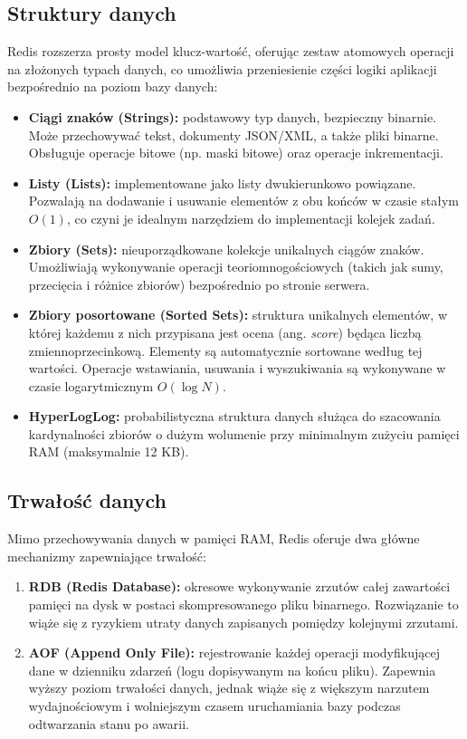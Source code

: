 \subsection{Struktury danych}
Redis rozszerza prosty model klucz-wartość, oferując zestaw atomowych operacji na złożonych typach danych, co umożliwia przeniesienie części logiki aplikacji bezpośrednio na poziom bazy danych:
\begin{itemize}
    \item \textbf{Ciągi znaków (Strings):} podstawowy typ danych, bezpieczny binarnie. Może przechowywać tekst, dokumenty JSON/XML, a także pliki binarne. Obsługuje operacje bitowe (np. maski bitowe) oraz operacje inkrementacji.
    \item \textbf{Listy (Lists):} implementowane jako listy dwukierunkowo powiązane. Pozwalają na dodawanie i usuwanie elementów z obu końców w czasie stałym $O(1)$, co czyni je idealnym narzędziem do implementacji kolejek zadań.
    \item \textbf{Zbiory (Sets):} nieuporządkowane kolekcje unikalnych ciągów znaków. Umożliwiają wykonywanie operacji teoriomnogościowych (takich jak sumy, przecięcia i różnice zbiorów) bezpośrednio po stronie serwera.
    \item \textbf{Zbiory posortowane (Sorted Sets):} struktura unikalnych elementów, w której każdemu z nich przypisana jest ocena (ang. \emph{score}) będąca liczbą zmiennoprzecinkową. Elementy są automatycznie sortowane według tej wartości. Operacje wstawiania, usuwania i wyszukiwania są wykonywane w czasie logarytmicznym $O(\log N)$.
    \item \textbf{HyperLogLog:} probabilistyczna struktura danych służąca do szacowania kardynalności zbiorów o dużym wolumenie przy minimalnym zużyciu pamięci RAM (maksymalnie 12 KB).
\end{itemize}
\subsection{Trwałość danych}
Mimo przechowywania danych w pamięci RAM, Redis oferuje dwa główne mechanizmy zapewniające trwałość:
\begin{enumerate}
    \item \textbf{RDB (Redis Database):} okresowe wykonywanie zrzutów całej zawartości pamięci na dysk w postaci skompresowanego pliku binarnego. Rozwiązanie to wiąże się z ryzykiem utraty danych zapisanych pomiędzy kolejnymi zrzutami.
    \item \textbf{AOF (Append Only File):} rejestrowanie każdej operacji modyfikującej dane w dzienniku zdarzeń (logu dopisywanym na końcu pliku). Zapewnia wyższy poziom trwałości danych, jednak wiąże się z większym narzutem wydajnościowym i wolniejszym czasem uruchamiania bazy podczas odtwarzania stanu po awarii.
\end{enumerate}
